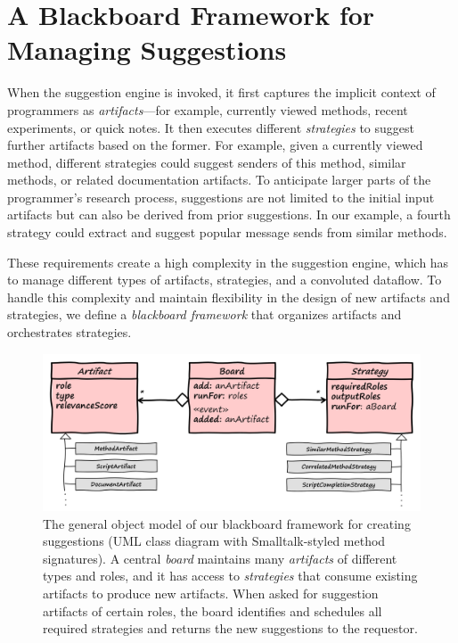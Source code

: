 
\section{A Blackboard Framework for Managing Suggestions}
\label{sec:design/suggestions}

When the suggestion engine is invoked, it first captures the implicit context of programmers as \emph{artifacts}---for example, currently viewed methods, recent experiments, or quick notes.
It then executes different \emph{strategies} to suggest further artifacts based on the former.
For example, given a currently viewed method, different strategies could suggest senders of this method, similar methods, or related documentation artifacts.
To anticipate larger parts of the programmer's research process, suggestions are not limited to the initial input artifacts but can also be derived from prior suggestions.
In our example, a fourth strategy could extract and suggest popular message sends from similar methods. %

These requirements create a high complexity in the suggestion engine, which has to manage different types of artifacts, strategies, and a convoluted dataflow.
To handle this complexity and maintain flexibility in the design of new artifacts and strategies, we define a \emph{blackboard framework} that organizes artifacts and orchestrates strategies.

\begin{figure}
	\centering
	\includegraphics[width=\textwidth]{02_suggestions/classes.png}
	\caption[The general object model of our \emph{blackboard framework} for creating suggestions.]{
		The general object model of our blackboard framework for creating suggestions (UML class diagram with Smalltalk-styled method signatures).
		A central \emph{board} maintains many \emph{artifacts} of different types and roles, and it has access to \emph{strategies} that consume existing artifacts to produce new artifacts.
		When asked for suggestion artifacts of certain roles, the board identifies and schedules all required strategies and returns the new suggestions to the requestor.
	}
	\label{fig:design/suggestions/classes}
\end{figure}

